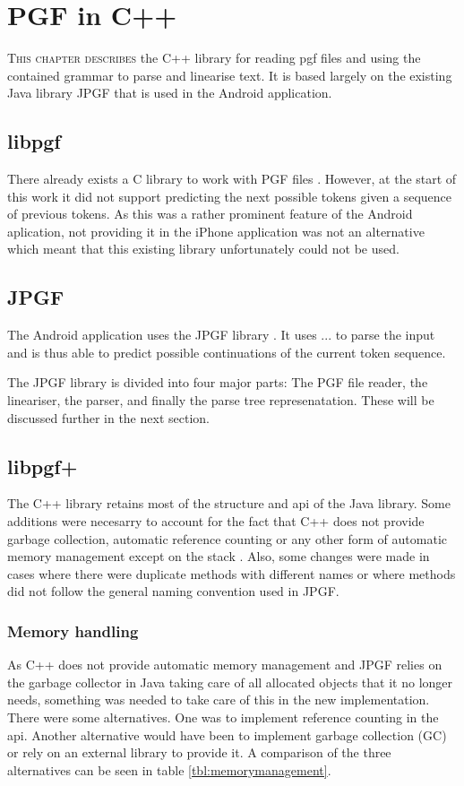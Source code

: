 \chapter{PGF in C++}
\lettrine[lines=4, loversize=-0.1, lraise=0.1]{T}{his chapter describes} the C++ library for reading pgf files and using the contained grammar to parse and linearise text. It is based largely on the existing Java library JPGF that is used in the Android application.


\section{libpgf}
There already exists a C library to work with PGF files \cite{libpgf}. However, at the start of this work it did not support predicting the next possible tokens given a sequence of previous tokens. As this was a rather prominent feature of the Android aplication, not providing it in the iPhone application was not an alternative which meant that this existing library unfortunately could not be used.


\section{JPGF}
The Android application uses the JPGF library \cite{jpgf}. It uses ... to parse the input and is thus able to predict possible continuations of the current token sequence.

The JPGF library is divided into four major parts: The PGF file reader, the lineariser, the parser, and finally the parse tree represenatation. These will be discussed further in the next section.


\section{libpgf+}
The C++ library retains most of the structure and api of the Java library. Some additions were necesarry to account for the fact that C++ does not provide garbage collection, automatic reference counting or any other form of automatic memory management except on the stack \cite{cppmemoryhandling}. Also, some changes were made in cases where there were duplicate methods with different names or where methods did not follow the general naming convention used in JPGF.


\subsection{Memory handling}
As C++ does not provide automatic memory management and JPGF relies on the garbage collector in Java taking care of all allocated objects that it no longer needs, something was needed to take care of this in the new implementation. There were some alternatives. One was to implement reference counting \cite{refcount} in the api. Another alternative would have been to implement garbage collection (GC) \cite{gc} or rely on an external library to provide it. A comparison of the three alternatives can be seen in table \ref{tbl:memorymanagement}.

